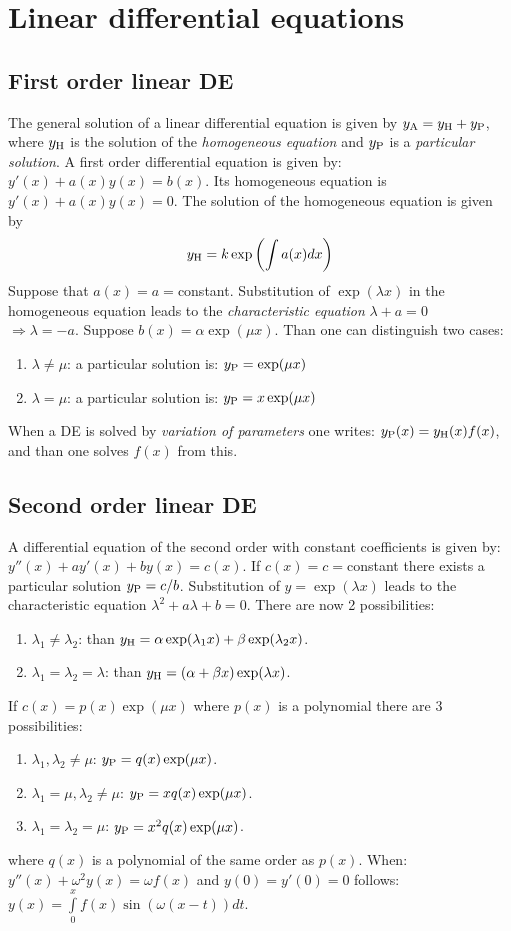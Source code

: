 \documentclass[a4paper,fancyheadings,twoside]{report}
\begin{document}
\section{Linear differential equations}
\subsection{First order linear DE}
The general solution of a linear differential equation is given by
$y_{\rm A}=y_{\rm H}+y_{\rm P}$, where $y_{\rm H}$ is the solution of the
{\it homogeneous equation} and $y_{\rm P}$ is a {\it particular solution}.
\npar
A first order differential equation is given by: $y'(x)+a(x)y(x)=b(x)$.
Its homogeneous equation is $y'(x)+a(x)y(x)=0$.
\npar
The solution of the homogeneous equation is given by
\[
y_{\rm H}=k\exp\left(\int a(x)dx\right)
\]
Suppose that $a(x)=a=$constant.
\npar
Substitution of $\exp(\lambda x)$ in the homogeneous equation leads to the
{\it characteristic equation} $\lambda+a=0$\\ $\Rightarrow\lambda=-a$.
\npar
Suppose $b(x)=\alpha\exp(\mu x)$. Than one can distinguish two cases:
\begin{enumerate}
\item $\lambda\neq\mu$: a particular solution is: $y_{\rm P}=\exp(\mu x)$
\item $\lambda=\mu$: a particular solution is: $y_{\rm P}=x\exp(\mu x)$
\end{enumerate}
\npar
When a DE is solved by {\it variation of parameters} one writes:
$y_{\rm P}(x)=y_{\rm H}(x)f(x)$, and than one solves $f(x)$ from this.

\subsection{Second order linear DE}
A differential equation of the second order with constant coefficients is given
by: $y''(x)+ay'(x)+by(x)=c(x)$. If $c(x)=c=$constant there exists a particular
solution $y_{\rm P}=c/b$.
\npar
Substitution of $y=\exp(\lambda x)$ leads to the characteristic equation
$\lambda^2+a\lambda+b=0$.
\npar
There are now 2 possibilities:
\begin{enumerate}
\item $\lambda_1\neq\lambda_2$: than $y_{\rm H}=\alpha\exp(\lambda_1 x)+\beta\exp(\lambda_2 x)$.
\item $\lambda_1=\lambda_2=\lambda$: than $y_{\rm H}=(\alpha +\beta x)\exp(\lambda x)$.
\end{enumerate}
\npar
If $c(x)=p(x)\exp(\mu x)$ where $p(x)$ is a polynomial there are 3 possibilities:
\begin{enumerate}
\item $\lambda_1,\lambda_2\neq\mu$: $y_{\rm P}=q(x)\exp(\mu x)$.
\item $\lambda_1=\mu,\lambda_2\neq\mu$: $y_{\rm P}=xq(x)\exp(\mu x)$.
\item $\lambda_1=\lambda_2=\mu$: $y_{\rm P}=x^2q(x)\exp(\mu x)$.
\end{enumerate}
where $q(x)$ is a polynomial of the same order as $p(x)$.
\npar
When: $y''(x)+\omega^2y(x)=\omega f(x)$ and $y(0)=y'(0)=0$ follows:
$y(x)=\int\limits_0^xf(x)\sin(\omega(x-t))dt$.
\end{document}
